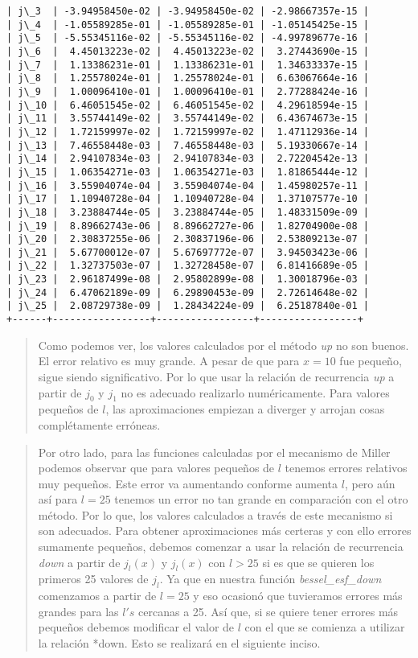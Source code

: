 \documentclass[9pt]{article}
\begin{document}
\begin{Verbatim}[commandchars=\\\{\}]
| j\_3  | -3.94958450e-02 | -3.94958450e-02 | -2.98667357e-15 |
| j\_4  | -1.05589285e-01 | -1.05589285e-01 | -1.05145425e-15 |
| j\_5  | -5.55345116e-02 | -5.55345116e-02 | -4.99789677e-16 |
| j\_6  |  4.45013223e-02 |  4.45013223e-02 |  3.27443690e-15 |
| j\_7  |  1.13386231e-01 |  1.13386231e-01 |  1.34633337e-15 |
| j\_8  |  1.25578024e-01 |  1.25578024e-01 |  6.63067664e-16 |
| j\_9  |  1.00096410e-01 |  1.00096410e-01 |  2.77288424e-16 |
| j\_10 |  6.46051545e-02 |  6.46051545e-02 |  4.29618594e-15 |
| j\_11 |  3.55744149e-02 |  3.55744149e-02 |  6.43674673e-15 |
| j\_12 |  1.72159997e-02 |  1.72159997e-02 |  1.47112936e-14 |
| j\_13 |  7.46558448e-03 |  7.46558448e-03 |  5.19330667e-14 |
| j\_14 |  2.94107834e-03 |  2.94107834e-03 |  2.72204542e-13 |
| j\_15 |  1.06354271e-03 |  1.06354271e-03 |  1.81865444e-12 |
| j\_16 |  3.55904074e-04 |  3.55904074e-04 |  1.45980257e-11 |
| j\_17 |  1.10940728e-04 |  1.10940728e-04 |  1.37107577e-10 |
| j\_18 |  3.23884744e-05 |  3.23884744e-05 |  1.48331509e-09 |
| j\_19 |  8.89662743e-06 |  8.89662727e-06 |  1.82704900e-08 |
| j\_20 |  2.30837255e-06 |  2.30837196e-06 |  2.53809213e-07 |
| j\_21 |  5.67700012e-07 |  5.67697772e-07 |  3.94503423e-06 |
| j\_22 |  1.32737503e-07 |  1.32728458e-07 |  6.81416689e-05 |
| j\_23 |  2.96187499e-08 |  2.95802899e-08 |  1.30018796e-03 |
| j\_24 |  6.47062189e-09 |  6.29890453e-09 |  2.72614648e-02 |
| j\_25 |  2.08729738e-09 |  1.28434224e-09 |  6.25187840e-01 |
+------+-----------------+-----------------+-----------------+
    \end{Verbatim}

    \begin{quote}
Como podemos ver, los valores calculados por el método \emph{up} no son
buenos. El error relativo es muy grande. A pesar de que para \(x=10\)
fue pequeño, sigue siendo significativo. Por lo que usar la relación de
recurrencia \emph{up} a partir de \(j_0\) y \(j_1\) no es adecuado
realizarlo numéricamente. Para valores pequeños de \(l\), las
aproximaciones empiezan a diverger y arrojan cosas complétamente
erróneas.
\end{quote}

\begin{quote}
Por otro lado, para las funciones calculadas por el mecanismo de Miller
podemos observar que para valores pequeños de \(l\) tenemos errores
relativos muy pequeños. Este error va aumentando conforme aumenta \(l\),
pero aún así para \(l=25\) tenemos un error no tan grande en comparación
con el otro método. Por lo que, los valores calculados a través de este
mecanismo si son adecuados. Para obtener aproximaciones más certeras y
con ello errores sumamente pequeños, debemos comenzar a usar la relación
de recurrencia \emph{down} a partir de \(j_l(x)\) y \(j_l(x)\) con
\(l>25\) si es que se quieren los primeros 25 valores de \(j_l\). Ya que
en nuestra función \emph{bessel\_esf\_down} comenzamos a partir de
\(l=25\) y eso ocasionó que tuvieramos errores más grandes para las
\(l's\) cercanas a 25. Así que, si se quiere tener errores más pequeños
debemos modificar el valor de \(l\) con el que se comienza a utilizar la
relación *down. Esto se realizará en el siguiente inciso.
\end{quote}
\end{document}
